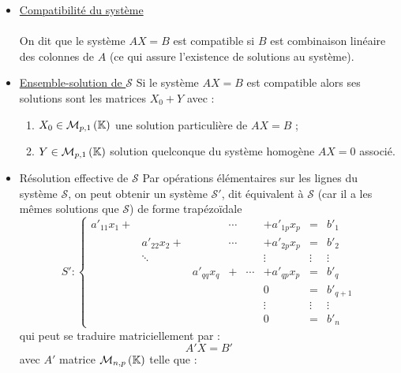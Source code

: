 \begin{defprop}
    \begin{itemize}
        \item \underline{Compatibilité du système}\\~\\
        On dit que le système \(AX = B\) est compatible si \(B\) est combinaison linéaire des colonnes de \(A\) (ce qui assure l’existence de solutions au système).
        \item \underline{Ensemble-solution de \(\mathcal{S}\)}
        Si le système \(AX = B\) est compatible alors ses solutions sont les matrices \(X_0 + Y\) avec :
        \begin{enumerate}
            \item \(X_0 \in \mathcal{M}_{p,1}\left(\mathbb{K}\right)\) une solution particulière de \(AX = B\) ;
            \item \(Y \in \mathcal{M}_{p,1}\left(\mathbb{K}\right)\) solution quelconque du système homogène \(AX = 0\) associé.
        \end{enumerate}
        \item Résolution effective de \(\mathcal{S}\)
        Par opérations élémentaires sur les lignes du système \(\mathcal{S}\), on peut obtenir un système \(\mathcal{S}'\), dit équivalent à \(\mathcal{S}\) (car il a les mêmes solutions que \(\mathcal{S}\)) de forme trapézoïdale
        \[S' : \left\{
        \begin{array}{rccccccl}
        a'_{11}x_1 +&            &            &\cdots&      & + a'_{1p}x_p&=      & b'_1     \\
                    &a'_{22}x_2 +&            &\cdots&      & + a'_{2p}x_p&=      & b'_2     \\
                    &  \ddots    &            &      &      & \vdots      & \vdots&\vdots    \\
                    &            &a'_{qq}x_q  &+     &\cdots& + a'_{qp}x_p&=      & b'_q     \\
                    &            &            &      &      &0            &=      & b'_{q+1} \\
                    &            &            &      &      & \vdots      &\vdots& \vdots    \\
                    &            &            &      &      & 0           &=      & b'_n
        \end{array}
        \right.\] 
        qui peut se traduire matriciellement par :
        \[A'X = B'\]
        avec \(A'\) matrice  \(\mathcal{M}_{n,p}\left(\mathbb{K}\right)\) telle que :
        \begin{itemize}

\end{itemize}
\end{itemize}
\end{defprop}
